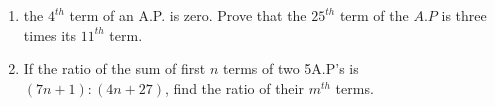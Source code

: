 \documentclass{article}
\begin{document}
\begin{enumerate}

\item the $4^{th}$ term of an A.P. is zero. Prove that the $25^{th}$ term of the $A.P$ is three times its $11^{th}$ term.

\item If the ratio of the sum of first $n$ terms of two 5A.P's is $(7n+1):(4n+27)$, find the ratio of their $m^{th}$ terms.

\end{enumerate}
\end{document}
